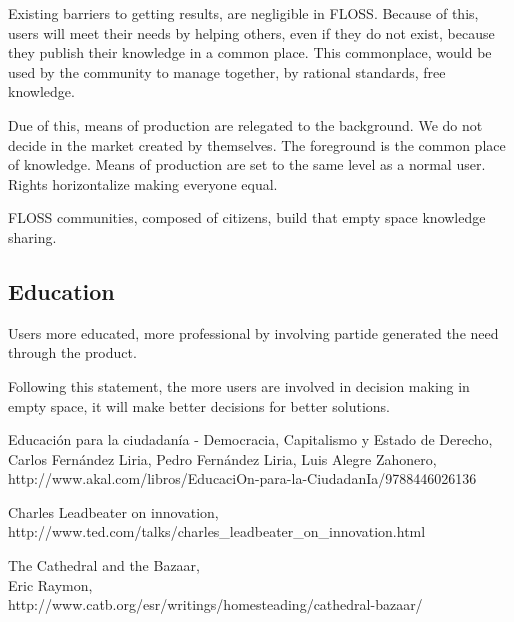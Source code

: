 \documentclass[11pt]{scrartcl}
\begin{document}
\par Existing barriers to getting results, are negligible in FLOSS.
Because of this, users will meet their needs by helping others, even if they do not exist, because they publish their knowledge in a common place. This commonplace, would be used by the community to manage together, by rational standards, free knowledge.

\par Due of this, means of production are relegated to the background. We do not decide in the market created by themselves. The foreground is the common place of knowledge. Means of production are set to the same level as a normal user. Rights horizontalize making everyone equal.

\par FLOSS communities, composed of citizens, build that empty space knowledge sharing\cite{edu-ciudadania}.

\subsection{Education}
\label{sub:education}

\par Users more educated, more professional by involving partide generated the need through the product.

\par Following this statement, the more users are involved in decision making in empty space, it will make better decisions for better solutions.

\begin{thebibliography}{9}

    Educación para la ciudadanía - Democracia, Capitalismo y Estado de Derecho,\\
    Carlos Fernández Liria, Pedro Fernández Liria, Luis Alegre Zahonero,\\
    http://www.akal.com/libros/EducaciOn-para-la-CiudadanIa/9788446026136

    Charles Leadbeater on innovation,\\
    http://www.ted.com/talks/charles\_leadbeater\_on\_innovation.html

    The Cathedral and the Bazaar,\\
    Eric Raymon,\\
    http://www.catb.org/esr/writings/homesteading/cathedral-bazaar/
    
\end{thebibliography}
\end{document}
